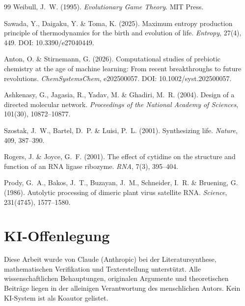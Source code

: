 \documentclass[12pt,a4paper]{article}
\theoremstyle{remark}
\begin{document}
\begin{thebibliography}{99}
Weibull, J.~W. (1995).
\newblock \textit{Evolutionary Game Theory}.
\newblock MIT Press.

Sawada, Y., Daigaku, Y. \& Toma, K. (2025).
\newblock Maximum entropy production principle of thermodynamics for the birth and evolution of life.
\newblock \textit{Entropy}, 27(4), 449.
\newblock DOI: 10.3390/e27040449.

Anton, O. \& Stirnemann, G. (2026).
\newblock Computational studies of prebiotic chemistry at the age of machine learning: From recent breakthroughs to future revolutions.
\newblock \textit{ChemSystemsChem}, e202500057.
\newblock DOI: 10.1002/syst.202500057.

Ashkenasy, G., Jagasia, R., Yadav, M. \& Ghadiri, M.~R. (2004).
\newblock Design of a directed molecular network.
\newblock \textit{Proceedings of the National Academy of Sciences}, 101(30), 10872--10877.

Szostak, J.~W., Bartel, D.~P. \& Luisi, P.~L. (2001).
\newblock Synthesizing life.
\newblock \textit{Nature}, 409, 387--390.

Rogers, J. \& Joyce, G.~F. (2001).
\newblock The effect of cytidine on the structure and function of an RNA ligase ribozyme.
\newblock \textit{RNA}, 7(3), 395--404.

Prody, G.~A., Bakos, J.~T., Buzayan, J.~M., Schneider, I.~R. \& Bruening, G. (1986).
\newblock Autolytic processing of dimeric plant virus satellite RNA.
\newblock \textit{Science}, 231(4745), 1577--1580.

\end{thebibliography}

\section*{KI-Offenlegung}
Diese Arbeit wurde von Claude (Anthropic) bei der Literatursynthese, mathematischen Verifikation und Texterstellung unterst\"utzt. Alle wissenschaftlichen Behauptungen, originalen Argumente und theoretischen Beitr\"age liegen in der alleinigen Verantwortung des menschlichen Autors. Kein KI-System ist als Koautor gelistet.
\end{document}
